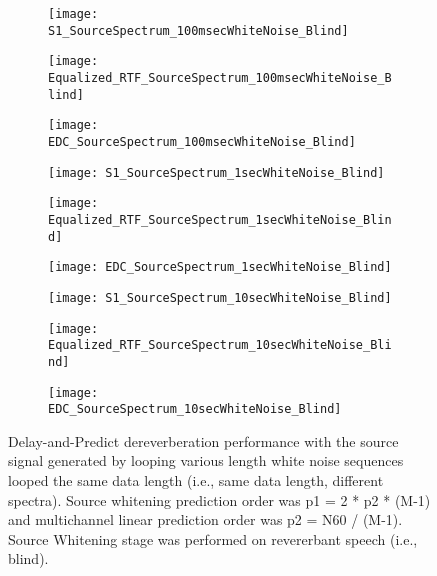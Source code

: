 \begin{figure}[H]
	\centering
	\begin{subfigure}[b]{0.3\textwidth}
		\centering
		\texttt{[image: S1\_SourceSpectrum\_100msecWhiteNoise\_Blind]}
	\end{subfigure}
	\begin{subfigure}[b]{0.3\textwidth}
		\centering
		\texttt{[image: Equalized\_RTF\_SourceSpectrum\_100msecWhiteNoise\_Blind]}
	\end{subfigure}
	\begin{subfigure}[b]{0.3\textwidth}
		\centering
		\texttt{[image: EDC\_SourceSpectrum\_100msecWhiteNoise\_Blind]}
	\end{subfigure}
	\begin{subfigure}[b]{0.3\textwidth}
		\centering
		\texttt{[image: S1\_SourceSpectrum\_1secWhiteNoise\_Blind]}
	\end{subfigure}
	\begin{subfigure}[b]{0.3\textwidth}
		\centering
		\texttt{[image: Equalized\_RTF\_SourceSpectrum\_1secWhiteNoise\_Blind]}
	\end{subfigure}
	\begin{subfigure}[b]{0.3\textwidth}
		\centering
		\texttt{[image: EDC\_SourceSpectrum\_1secWhiteNoise\_Blind]}
	\end{subfigure}
	\begin{subfigure}[b]{0.3\textwidth}
		\centering
		\texttt{[image: S1\_SourceSpectrum\_10secWhiteNoise\_Blind]}
	\end{subfigure}
	\begin{subfigure}[b]{0.3\textwidth}
		\centering
		\texttt{[image: Equalized\_RTF\_SourceSpectrum\_10secWhiteNoise\_Blind]}
	\end{subfigure}
	\begin{subfigure}[b]{0.3\textwidth}
		\centering
		\texttt{[image: EDC\_SourceSpectrum\_10secWhiteNoise\_Blind]}
	\end{subfigure}
	\caption{Delay-and-Predict dereverberation performance with the source signal generated by looping various length white noise sequences looped the same data length (i.e., same data length, different spectra). Source whitening prediction order was p1 = 2 * p2 * (M-1) and multichannel linear prediction order was p2 = N60 / (M-1). Source Whitening stage was performed on revererbant speech (i.e., blind).}
	\label{fig:params_source_spectrum_compare}
\end{figure}

